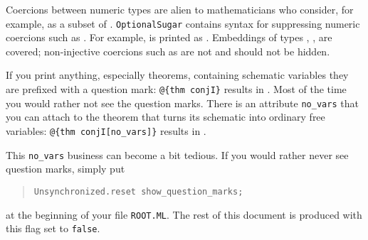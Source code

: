 \begin{isabellebody}
\begin{isamarkuptext}
\begin{itemize}
\end{itemize}%
\end{isamarkuptext}%
\isamarkuptrue%
%
\isamarkuptrue%
%
\begin{isamarkuptext}%
Coercions between numeric types are alien to mathematicians who
consider, for example,  as a subset of .
\texttt{OptionalSugar} contains syntax for suppressing numeric coercions such
as  \isa{{\isacharcolon}{\isacharcolon}} . For example,
 is printed as . Embeddings of types
, ,  are covered; non-injective coercions such
as  \isa{{\isacharcolon}{\isacharcolon}}  are not and should not be
hidden.%
\end{isamarkuptext}%
\isamarkuptrue%
%
\isamarkuptrue%
%
\isamarkuptrue%
%
\begin{isamarkuptext}%
If you print anything, especially theorems, containing
schematic variables they are prefixed with a question mark:
\verb!@!\verb!{thm conjI}! results in . Most of the time
you would rather not see the question marks. There is an attribute
\verb!no_vars! that you can attach to the theorem that turns its
schematic into ordinary free variables: \verb!@!\verb!{thm conjI[no_vars]}!
results in .

This \verb!no_vars! business can become a bit tedious.
If you would rather never see question marks, simply put
\begin{quote}
\verb|Unsynchronized.reset show_question_marks|\verb!;!
\end{quote}
at the beginning of your file \texttt{ROOT.ML}.
The rest of this document is produced with this flag set to \texttt{false}.


\end{isamarkuptext}
\end{isabellebody}
